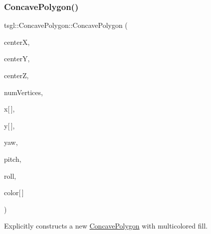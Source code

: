 \subsubsection{\texorpdfstring{Concave\+Polygon()}{ConcavePolygon()}\hspace{0.1cm}{\footnotesize\ttfamily [3/3]}}
{\footnotesize\ttfamily tsgl\+::\+Concave\+Polygon\+::\+Concave\+Polygon (\begin{DoxyParamCaption}\item[{float}]{centerX,  }\item[{float}]{centerY,  }\item[{float}]{centerZ,  }\item[{int}]{num\+Vertices,  }\item[{float}]{x\mbox{[}$\,$\mbox{]},  }\item[{float}]{y\mbox{[}$\,$\mbox{]},  }\item[{float}]{yaw,  }\item[{float}]{pitch,  }\item[{float}]{roll,  }\item[{\hyperlink{structtsgl_1_1_color_float}{Color\+Float}}]{color\mbox{[}$\,$\mbox{]} }\end{DoxyParamCaption})}



Explicitly constructs a new \hyperlink{classtsgl_1_1_concave_polygon}{Concave\+Polygon} with multicolored fill. 

